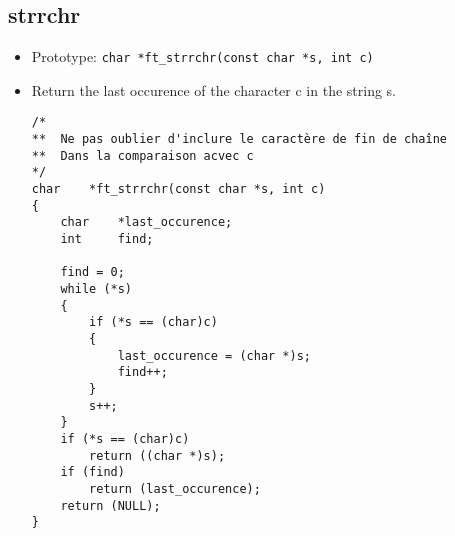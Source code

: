 \documentclass{article}
\begin{document}
		\subsection{strrchr}
			\begin{itemize}[label=$\rightarrow$]
				\item Prototype: \texttt{char		*ft\_strrchr(const char *s, int c)}
				\item Return the last occurence of the character c in the string s.
				\begin{verbatim}
/*                                                                              
**  Ne pas oublier d'inclure le caractère de fin de chaîne                      
**  Dans la comparaison acvec c                                                 
*/                                                                              
char    *ft_strrchr(const char *s, int c)                                       
{                                                                               
    char    *last_occurence;                                                    
    int     find;                                                               
                                                                                
    find = 0;                                                                   
    while (*s)                                                                  
    {                                                                           
        if (*s == (char)c)                                                      
        {                                                                       
            last_occurence = (char *)s;                                         
            find++;                                                             
        }                                                                       
        s++;                                                                    
    }                                                                           
    if (*s == (char)c)                                                          
        return ((char *)s);                                                     
    if (find)                                                                   
        return (last_occurence);                                                
    return (NULL);                                                              
}  
				\end{verbatim}
			\end{itemize}
			
\end{document}
